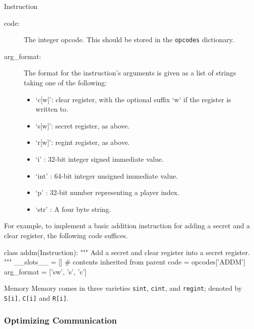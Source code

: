 \begin{mylisting}
\begin{class}{Instruction}
\begin{description}
\item[code:] The integer opcode. This should be stored in the \verb|opcodes|
dictionary.
\item[arg_format:] The format for the instruction's arguments is given as a
list of strings taking one of the following:
\begin{itemize}
\item `c[w]': clear register, with the optional suffix `w' if the register is
written to.
\item `s[w]': secret register, as above.
\item `r[w]': regint register, as above.
\item `i'   : 32-bit integer signed immediate value.
\item `int' : 64-bit integer unsigned immediate value.
\item `p'   : 32-bit number representing a player index.
\item `str' : A four byte string.
\end{itemize}
\end{description}

For example, to implement a basic addition instruction for adding a secret
and a clear register, the following code suffices.

\begin{mylisting}
class addm(Instruction):
    """ Add a secret and clear register into a secret register. """
    __slots__ = [] # contents inherited from parent
    code = opcodes['ADDM']
    arg_format = ['sw', 's', 'c']
\end{mylisting}

\end{class}

\begin{class}{Memory}
Memory comes in three varieties \verb+sint+, \verb+cint+, and
\verb+regint+; denoted by \verb+S[i]+, \verb+C[i]+ and \verb+R[i]+.
\end{class}

\subsubsection{Optimizing Communication}


\end{mylisting}
